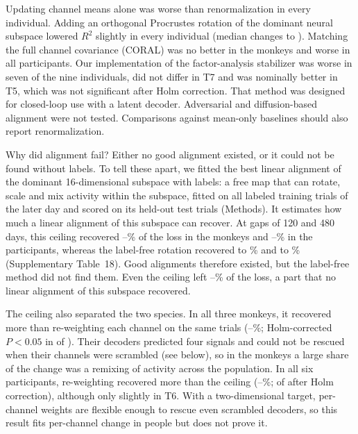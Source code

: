 \documentclass[pdflatex,sn-nature]{sn-jnl}
\begin{document}
Updating channel means alone was worse than renormalization in every individual. Adding an orthogonal Procrustes
rotation of the dominant neural subspace\cite{schonemann1966} lowered $R^2$ slightly in every individual (median changes
 to ). Matching the full channel covariance (CORAL\cite{sun2016}) was no
better in the monkeys and worse in all  participants. Our implementation of the factor-analysis
stabilizer\cite{degenhart2020} was worse in seven of the nine individuals, did not differ in T7 and was nominally better
in T5, which was not significant after Holm correction. That method was designed for closed-loop use with a latent
decoder. Adversarial\cite{farshchian2019,ma2023,karpowicz2025} and diffusion-based\cite{wang2023erdiff} alignment
were not tested. Comparisons against mean-only
baselines\cite{wilson2025} should also report renormalization.

Why did alignment fail? Either no good alignment existed, or it could not be found without labels. To tell these apart,
we fitted the best linear alignment of the dominant 16-dimensional subspace with labels: a free map that can rotate,
scale and mix activity within the subspace, fitted on all labeled training trials of the later day and scored on its
held-out test trials (Methods). It estimates how much a linear alignment of this subspace can recover. At gaps of 120
and 480 days, this ceiling recovered --\% of the loss in the monkeys and
--\% in the participants, whereas the label-free rotation recovered
 to \% and  to \%
(Supplementary Table~18). Good alignments therefore existed, but the label-free method did not find them. Even the
ceiling left --\% of the loss, a part that no linear alignment of this
subspace recovered.

The ceiling also separated the two species. In all three monkeys, it recovered more than re-weighting each channel on
the same trials (--\%; Holm-corrected $P < 0.05$ in
 of ). Their decoders predicted four signals and could not be rescued when
their channels were scrambled (see below), so in the monkeys a large share of the change was a remixing of activity
across the population. In all six participants, re-weighting recovered more than the ceiling
(--\%;  of  after Holm correction),
although only slightly in T6. With a two-dimensional target, per-channel weights are flexible enough to rescue even
scrambled decoders, so this result fits per-channel change in people but does not prove it.
\end{document}
